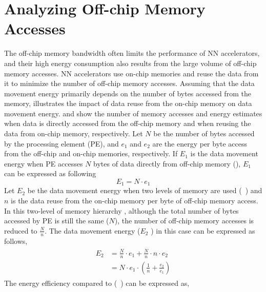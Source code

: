 \graphicspath{{./Ch2-AnalyticalFw/images/}}

\chapter{Analyzing Off-chip Memory Accesses} \label{chap:analyticalFw}
The off-chip memory bandwidth often limits the performance of NN accelerators, and their high energy consumption also results from the large volume of off-chip memory accesses. NN accelerators use on-chip memories and reuse the data from it to minimize the number of off-chip memory accesses. Assuming that the data movement energy primarily depends on the number of bytes accessed from the memory,  illustrates the impact of data reuse from the on-chip memory on data movement energy.  and  show the number of memory accesses and energy estimates when data is directly accessed from the off-chip memory and when reusing the data from on-chip memory, respectively. Let $N$ be the number of bytes accessed by the processing element (PE), and $e_{1}$ and $e_{2}$ are the energy per byte access from the off-chip and on-chip memories, respectively. If $E_1$ is the data movement energy when PE accesses $N$ bytes of data directly from off-chip memory (), $E_1$ can be expressed as following
\begin{equation}\label{eq:E_1} 
	E_{1}= N\cdot e_1
\end{equation}
Let $E_2$ be the data movement energy when two levels of memory are used (~) and $n$ is the data reuse from the on-chip memory per byte of off-chip memory access. In this two-level of memory hierarchy , although the total number of bytes accessed by PE is still the same ($N$), the number of off-chip memory accesses is reduced to $\frac{N}{n}$. The data movement energy ($E_2$ ) in this case can be expressed as follows,
\begin{align}\label{eq:E_2}
	\begin{split}
	E_{2}&= \frac{N}{n}\cdot e_1 + \frac{N}{n}\cdot n\cdot e_2 \\
	&= N\cdot e_1\cdot (\frac{1}{n}+ \frac{e_2}{e_1})
	\end{split}
\end{align}
The energy efficiency compared to (~) can be expressed as, 
